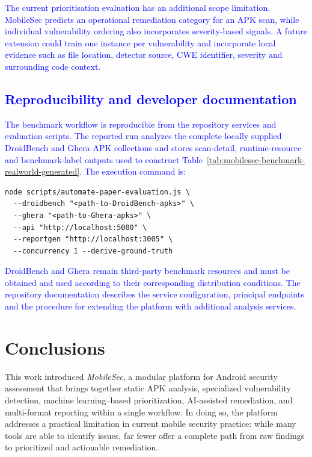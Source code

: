 \documentclass[preprint,12pt, a4paper]{elsarticle}
\begin{document}
\textcolor{blue}{The current prioritisation evaluation has an additional scope limitation. MobileSec predicts an operational remediation category for an APK scan, while individual vulnerability ordering also incorporates severity-based signals. A future extension could train one instance per vulnerability and incorporate local evidence such as file location, detector source, CWE identifier, severity and surrounding code context.}

\subsection{\textcolor{blue}{Reproducibility and developer documentation}}

\textcolor{blue}{The benchmark workflow is reproducible from the repository services and evaluation scripts. The reported run analyzes the complete locally supplied DroidBench and Ghera APK collections and stores scan-detail, runtime-resource and benchmark-label outputs used to construct Table~\ref{tab:mobilesec-benchmark-realworld-generated}. The execution command is:}

{\color{blue}
\begin{verbatim}
node scripts/automate-paper-evaluation.js \
  --droidbench "<path-to-DroidBench-apks>" \
  --ghera "<path-to-Ghera-apks>" \
  --api "http://localhost:5000" \
  --reportgen "http://localhost:3005" \
  --concurrency 1 --derive-ground-truth
\end{verbatim}
}

\textcolor{blue}{DroidBench and Ghera remain third-party benchmark resources and must be obtained and used according to their corresponding distribution conditions. The repository documentation describes the service configuration, principal endpoints and the procedure for extending the platform with additional analysis services.}

\section{Conclusions}

This work introduced \textit{MobileSec}, a modular platform for Android security assessment that brings together static APK analysis, specialized vulnerability detection, machine learning–based prioritization, AI-assisted remediation, and multi-format reporting within a single workflow. In doing so, the platform addresses a practical limitation in current mobile security practice: while many tools are able to identify issues, far fewer offer a complete path from raw findings to prioritized and actionable remediation.
\end{document}
